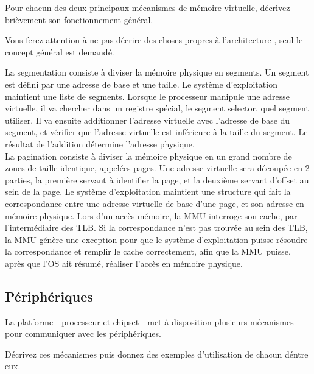 Pour chacun des deux principaux m\'ecanismes de m\'emoire virtuelle,
d\'ecrivez bri\`evement son fonctionnement g\'en\'eral.

Vous ferez attention \`a ne pas d\'ecrire des choses propres \`a
l'architecture , seul le concept g\'en\'eral est
demand\'e.

\begin{correction}

La segmentation consiste \`a diviser la m\'emoire physique en segments. Un
segment est d\'efini par une adresse de base et une taille. Le syst\`eme
d'exploitation maintient une liste de segments. Lorsque le processeur manipule
une adresse virtuelle, il va chercher dans un registre sp\'ecial, le segment
selector, quel segment utiliser. Il va ensuite additionner l'adresse virtuelle
avec l'adresse de base du segment, et v\'erifier que l'adresse virtuelle est
inf\'erieure \`a la taille du segment. Le r\'esultat de l'addition d\'etermine
l'adresse physique.\\

La pagination consiste \`a diviser la m\'emoire physique en un grand nombre de
zones de taille identique, appel\'ees pages. Une adresse virtuelle sera
d\'ecoup\'ee en 2 parties, la premi\`ere servant \`a identifier la page, et la
deuxi\`eme servant d'offset au sein de la page. Le syst\`eme d'exploitation
maintient une structure qui fait la correspondance entre une adresse virtuelle
de base d'une page, et son adresse en m\'emoire physique. Lors d'un acc\`es
m\'emoire, la MMU interroge son cache, par l'interm\'ediaire des TLB. Si la
correspondance n'est pas trouv\'ee au sein des TLB, la MMU g\'en\`ere une
exception pour que le syst\`eme d'exploitation puisse r\'esoudre la
correspondance et remplir le cache correctement, afin que la MMU puisse,
apr\`es que l'OS ait r\'esum\'e, r\'ealiser l'acc\`es en m\'emoire physique.

\end{correction}

%
%

\subsection{P\'eriph\'eriques
            }

La platforme---processeur et chipset---met \`a disposition plusieurs
m\'ecanismes pour communiquer avec les p\'eriph\'eriques.

D\'ecrivez ces m\'ecanismes puis donnez des exemples d'utilisation de
chacun d\'entre eux.

